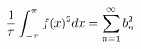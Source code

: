 \documentclass[preview]{standalone}
\begin{document}
\begin{align*}
\special{dvisvgm:raw <g id='unique000'>}\dfrac{1}{\pi}\displaystyle\int_{-\pi}^{\pi}f(x)^2dx=\sum_{n=1}^{\infty}b_n^2\special{dvisvgm:raw </g>}
\end{align*}
\end{document}
